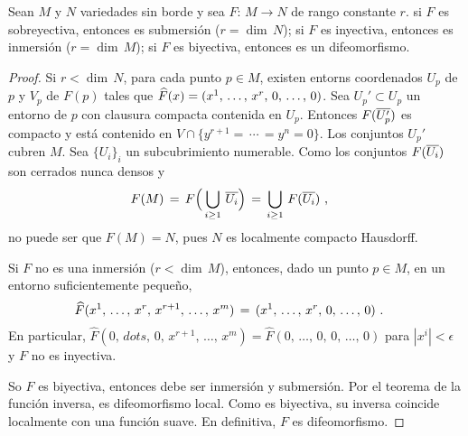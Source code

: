 \begin{coroDelRangoGlobal}\label{thm:delrangoglobal}
	Sean $M$ y $N$ variedades sin borde y sea $F:\,M\rightarrow N$ de
	rango constante $r$. si $F$ es sobreyectiva, entonces es
	submersi\'{o}n ($r=\dim\,N$); si $F$ es inyectiva, entonces
	es inmersi\'{o}n ($r=\dim\,M$); si $F$ es biyectiva, entonces es
	un difeomorfismo.
\end{coroDelRangoGlobal}

\begin{proof}
	Si $r<\dim\,N$, para cada punto $p\in M$, existen entorns coordenados
	$U_{p}$ de $p$ y $V_{p}$ de $F(p)$ tales que
	$\widehat{F}(x)=(\lista*{x}{r},\,0,\,\dots,\,0)$. Sea
	$U_{p}'\subset U_{p}$ un entorno de $p$ con clausura compacta
	contenida en $U_{p}$. Entonces $F(\overline{U_{p}'})$ es compacto y
	est\'{a} contenido en $V\cap\{y^{r+1}=\,\cdots\,=y^{n}=0\}$. Los
	conjuntos $U_{p}'$ cubren $M$. Sea $\{U_{i}\}_{i}$ un subcubrimiento
	numerable. Como los conjuntos $F(\overline{U_{i}})$ son cerrados
	nunca densos y
	\begin{align*}
		F(M) & \,=\,F\Big(\bigcup_{i\geq 1}\,\overline{U_{i}}\Big)
			\,=\,\bigcup_{i\geq 1}\,F(\overline{U_{i}})
		\text{ ,}
	\end{align*}
	no puede ser que $F(M)=N$, pues $N$ es localmente compacto
	Hausdorff.

	Si $F$ no es una inmersi\'{o}n ($r<\dim\,M$), entonces, dado
	un punto $p\in M$, en un entorno suficientemente peque\~{n}o,
	\begin{align*}
		\widehat{F}(x^{1},\,\dots,\,x^{r},\,x^{r+1},\,\dots,\,x^{m})
			& \,=\,(\lista*{x}{r},\,0,\,\dots,\,0)
		\text{ .}
	\end{align*}
	En particular, $\widehat{F}(0,\,dots,\,0,\,x^{r+1},\,\dots,\,x^{m})=%
	\widehat{F}(0,\,\dots,\,0,\,0,\,\dots,\,0)$ para $|x^{i}|<\epsilon$ y
	$F$ no es inyectiva.

	So $F$ es biyectiva, entonces debe ser inmersi\'{o}n y submersi\'{o}n.
	Por el teorema de la funci\'{o}n inversa, es difeomorfismo local.
	Como es biyectiva, su inversa coincide localmente con una funci\'{o}n
	suave. En definitiva, $F$ es difeomorfismo.
\end{proof}

